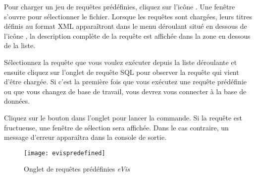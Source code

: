 Pour charger un jeu de requêtes prédéfinies, cliquez sur l'icône . Une fenêtre s'ouvre pour sélectionner le fichier. Lorsque les requêtes sont chargées, leurs titres définis au format XML apparaîtront dans le menu déroulant situé en dessous de l'icône , la description complète de la requête est affichée dans la zone en dessous de la liste.


Sélectionnez la requête que vous voulez exécuter depuis la liste déroulante et ensuite cliquez sur l'onglet de requête SQL pour observer la requête qui vient d'être chargée. Si c'est la première fois que vous exécutez une requête prédéfinie ou que vous changez de base de travail, vous devrez vous connecter à la base de données.


Cliquez sur le bouton  dans l'onglet  pour lancer la commande. Si la requête est fructueuse, une fenêtre de sélection sera affichée. Dans le cas contraire, un message d'erreur apparaîtra dans la console de sortie.


\begin{figure}[ht]
   \begin{center}
\texttt{[image: evispredefined]}
\caption{Onglet de requêtes prédéfinies \emph{eVis} \nixcaption}\label{evispredefined}
\end{center}
\end{figure}

